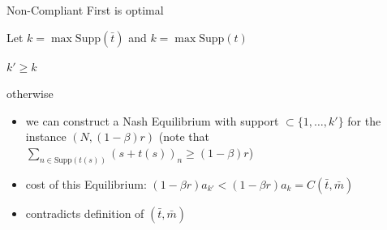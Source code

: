 \documentclass[xcolor=svgnames, english, smaller]{beamer}
\theoremstyle{plain}
\theoremstyle{definition}
\theoremstyle{plain}
\theoremstyle{plain}
\begin{document}
\begin{frame}{Non-Compliant First is optimal}

Let $k = \max \text{Supp}(\bar{t})$ and $k = \max \text{Supp}(t)$
\begin{lemma}
$k' \geq k$
\end{lemma}


otherwise
\begin{itemize}
\item we can construct a Nash Equilibrium with support $\subset \{ 1, \dots, k'\}$ for the instance $(N, (1-\beta)r)$ (note that $\sum_{n\in \text{Supp}(t(s))} (s+t(s))_n \geq (1-\beta)r$)\\
\item \pause cost of this Equilibrium: $(1-\beta r)a_{k'} < (1-\beta r)a_k = C(\bar{t}, \bar{m})$
\item \pause contradicts definition of $(\bar{t}, \bar{m})$
\end{itemize}

\end{frame}
\end{document}
